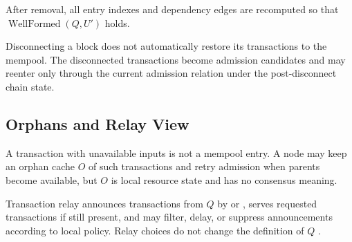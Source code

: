 After removal, all entry indexes and dependency edges are recomputed so that
\(\operatorname{WellFormed}(Q,U')\) holds.

Disconnecting a block does not automatically restore its transactions to the
mempool. The disconnected transactions become admission candidates and may
reenter only through the current admission relation under the post-disconnect
chain state.

\subsection{Orphans and Relay View}

A transaction with unavailable inputs is not a mempool entry. A node may keep an
orphan cache \(O\) of such transactions and retry admission when parents become
available, but \(O\) is local resource state and has no consensus meaning.

Transaction relay announces transactions from \(Q\) by  or
, serves requested transactions if still present, and may filter,
delay, or suppress announcements according to local policy. Relay choices do
not change the definition of \(Q\) \cite{bitcoin-core-v31}.
